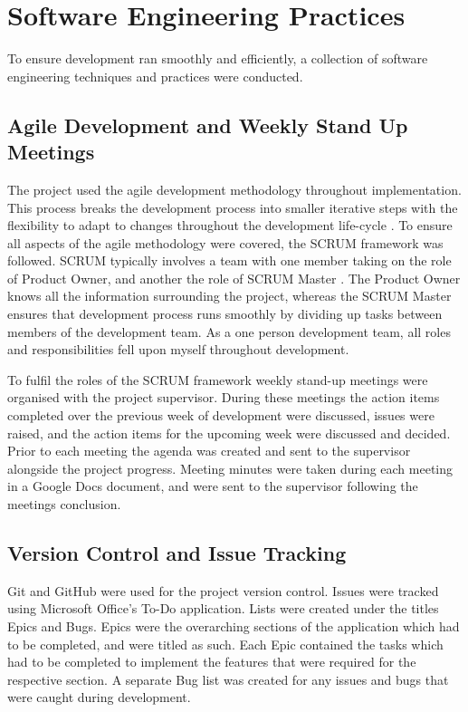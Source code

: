 \documentclass{l4proj}
\begin{document}
\section{Software Engineering Practices}
To ensure development ran smoothly and efficiently, a collection of software engineering techniques and practices were conducted.

\subsection{Agile Development and Weekly Stand Up Meetings}
The project used the agile development methodology throughout implementation. This process breaks the development process into smaller iterative steps with the flexibility to adapt to changes throughout the development life-cycle \citep{Atlassian}. To ensure all aspects of the agile methodology were covered, the SCRUM framework was followed. SCRUM typically involves a team with one member taking on the role of Product Owner, and another the role of SCRUM Master \citep{Scrum.org}. The Product Owner knows all the information surrounding the project, whereas the SCRUM Master ensures that development process runs smoothly by dividing up tasks between members of the development team. As a one person development team, all roles and responsibilities fell upon myself throughout development.

To fulfil the roles of the SCRUM framework weekly stand-up meetings were organised with the project supervisor. During these meetings the action items completed over the previous week of development were discussed, issues were raised, and the action items for the upcoming week were discussed and decided. Prior to each meeting the agenda was created and sent to the supervisor alongside the project progress. Meeting minutes were taken during each meeting in a Google Docs document, and were sent to the supervisor following the meetings conclusion.

\subsection{Version Control and Issue Tracking}
Git and GitHub were used for the project version control. Issues were tracked using Microsoft Office's To-Do application. Lists were created under the titles Epics and Bugs. Epics were the overarching sections of the application which had to be completed, and were titled as such. Each Epic contained the tasks which had to be completed to implement the features that were required for the respective section. A separate Bug list was created for any issues and bugs that were caught during development.
\end{document}
